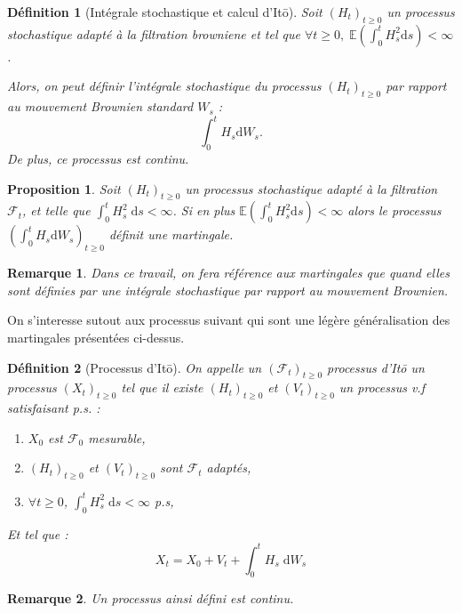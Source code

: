 \documentclass[openany]{book}
\newcommand{\F}{\mathscr{F}}
\newcommand{\E}{\mathbb{E}}
\newcommand{\1}{\mathbbm{1}}
\renewcommand{\d}{\mathrm{d}}
\theoremstyle{thmfont}
\theoremstyle{deffont}
\newtheorem{definition}[definition]{Définition}
\theoremstyle{thmfont}
\newtheorem{prop}[prop]{Proposition}
\theoremstyle{deffont}
\newtheorem{remark}[remark]{Remarque}
\begin{document}
\begin{definition}[Intégrale stochastique et calcul d'Itō]
  Soit $(H_t)_{t \geq 0}$ un processus stochastique adapté à la filtration browniene et tel que $\forall t \geq 0, \; \E \left(\int_0^t H_s^2 \d s\right) < \infty$.

  Alors, on peut définir \textit{l'intégrale stochastique} du processus $(H_t)_{t\geq0}$ par rapport au mouvement Brownien standard $W_s$ :
  $$ \int_0^t H_s \d W_s.$$
  De plus, ce processus est continu.
\end{definition}


\begin{prop} Soit $(H_t)_{t \geq 0}$ un processus stochastique adapté à la filtration  $\F_t$, et telle que $\int_0^t H_s^2\;\d s < \infty$. Si en plus $\E\left(\int_0^tH_s^2 \d s\right) < \infty$ alors le processus $(\int_0^t H_s \d W_s)_{t\geq 0}$ définit une martingale. 
\end{prop}

\begin{remark}
  Dans ce travail, on fera référence aux martingales que quand elles sont définies par une intégrale stochastique par rapport au mouvement Brownien.
\end{remark}


On s'interesse sutout aux processus suivant qui sont une légère généralisation des martingales présentées ci-dessus.
\begin{definition}[Processus d'Itō] On appelle un $(\F_t)_{t\geq0}$ \textit{processus d'Itō} un processus $(X_t)_{t\geq0}$ tel que il existe $(H_t)_{t\geq0}$ et $(V_t)_{t\geq 0}$ un processus v.f satisfaisant p.s. :
  \begin{enumerate}
  \item $X_0$ est $\F_0$ mesurable,
  \item $(H_t)_{t\geq0}$ et $(V_t)_{t\geq0}$ sont $\F_t$ adaptés,
  \item $\forall t \geq 0$, $\int_0^t H_s^2\;\d s < \infty$ p.s,
    \end{enumerate}

    Et tel que :
   $$X_t = X_0 + V_t + \int_0^t H_s \;\d W_s$$
 \end{definition}
 \begin{remark}
   \label{rmk:ContinuitePrIto}
   Un processus ainsi défini est continu.
 \end{remark}
 
\end{document}
